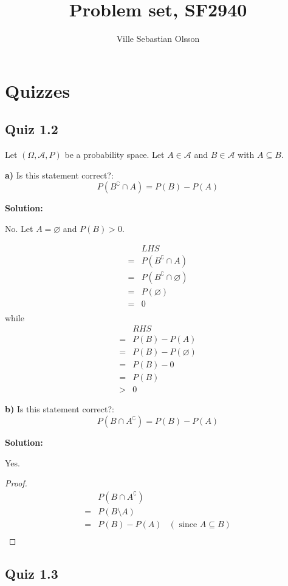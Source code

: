 \documentclass{article}
\title{Problem set, SF2940}
\author{Ville Sebastian Olsson}
\begin{document}
\maketitle
\tableofcontents

\section{Quizzes}
\subsection{Quiz 1.2}

Let \((\Omega, \mathcal{A}, P)\) be a probability space.
Let \(A\in \mathcal{A}\) and \(B\in \mathcal{A}\)
with \(A\subseteq B\).

\textbf{a)} Is this statement correct?:
\[P(B^\complement \cap A) = P(B)-P(A)\]

\textbf{Solution:}

No. Let \(A=\varnothing\) and \(P(B)>0\).

\begin{align*}
	 & LHS \\
	=& P(B^\complement \cap A) \\
	=& P(B^\complement \cap \varnothing) \\
	=& P(\varnothing) \\
	=& 0 \\
\end{align*}
while
\begin{align*}
	  & RHS \\
	 =& P(B)-P(A) \\
	 =& P(B)-P(\varnothing) \\
	 =& P(B)-0 \\
	 =& P(B) \\
	 >& 0
\end{align*}

\textbf{b)} Is this statement correct?:
\[P(B \cap A^\complement) = P(B)-P(A)\]

\textbf{Solution:}

Yes.
\begin{proof}
\begin{align*}
	 & P(B\cap A^\complement) \\
	=& P(B\setminus A) \\
	=& P(B)-P(A) & (\text{ since }A\subseteq B) \\
\end{align*}
\end{proof}
\subsection{Quiz 1.3}
\end{document}
